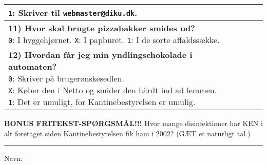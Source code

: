 \documentclass[a4paper]{article}
\begin{document}
\begin{center}
\begin{tabular}{|p{12cm}|p{0.2cm}|p{0.2cm}|p{0.2cm}|}
{  \texttt{1}: Skriver til \texttt{webmaster@diku.dk}.
  \vspace{0.1cm}
} & & & \\\hline
\parbox{12cm}{
  \vspace{0.2cm}
  \textbf{11) Hvor skal brugte pizzabakker smides ud?} \\
  \texttt{0}: I hyggehjørnet. \quad
  \texttt{X}: I papburet. \quad
  \texttt{1}: I de sorte affaldssække.
  \vspace{0.1cm}
} & & & \\\hline
\parbox{12cm}{
  \vspace{0.2cm}
  \textbf{12) Hvordan får jeg min yndlingschokolade i automaten?} \\
  \texttt{0}: Skriver på brugerønskesedlen. \\
  \texttt{X}: Køber den i Netto og smider den hårdt ind ad lemmen. \\
  \texttt{1}: Det er umuligt, for Kantinebestyrelsen er umulig.
  \vspace{0.1cm}
} & & & \\\hline
\end{tabular}

\vspace{0.5cm}

{\large\textbf{BONUS FRITEKST-SPØRGSMÅL!!!} Hvor mange disinfektioner har KEN i
alt foretaget siden Kantinebestyrelsen fik ham i 2002? (GÆT et naturligt tal.)
\\ \vspace{0.5cm} \rule{5cm}{0.4pt}}

\vspace{0.7cm}

{\large Navn: \hrulefill}

\end{center}
\end{document}
